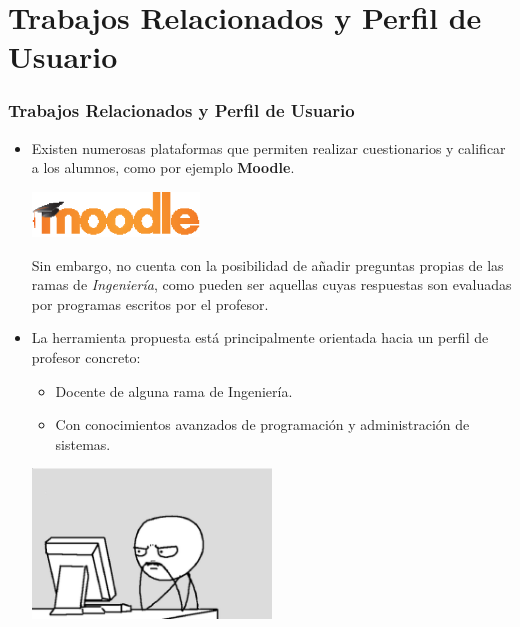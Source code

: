 \documentclass{beamer}
\begin{document}
\section{Trabajos Relacionados y Perfil de Usuario}
\begin{frame}[allowframebreaks]
  \frametitle{Trabajos Relacionados y Perfil de Usuario}
  
  \begin{itemize}
    \item Existen numerosas plataformas que permiten realizar cuestionarios y calificar a los alumnos, como por ejemplo {\bfseries Moodle}.
    \begin{center}
      \includegraphics[width=0.35\textwidth]{img/moodle.eps}
    \end{center}
    Sin embargo, no cuenta con la posibilidad de añadir preguntas propias de las ramas de \textit{Ingeniería}, como pueden ser aquellas
    cuyas respuestas son evaluadas por programas escritos por el profesor.
    \framebreak
    
    \item La herramienta propuesta está principalmente orientada hacia un perfil de profesor concreto:
    \begin{itemize}
      \item Docente de alguna rama de Ingeniería.
      \item Con conocimientos avanzados de programación y administración de sistemas.
    \end{itemize}
    
    \begin{center}
      \includegraphics[width=0.5\textwidth]{img/meme.eps}
    \end{center}
  \end{itemize}
  
\end{frame}
\end{document}
